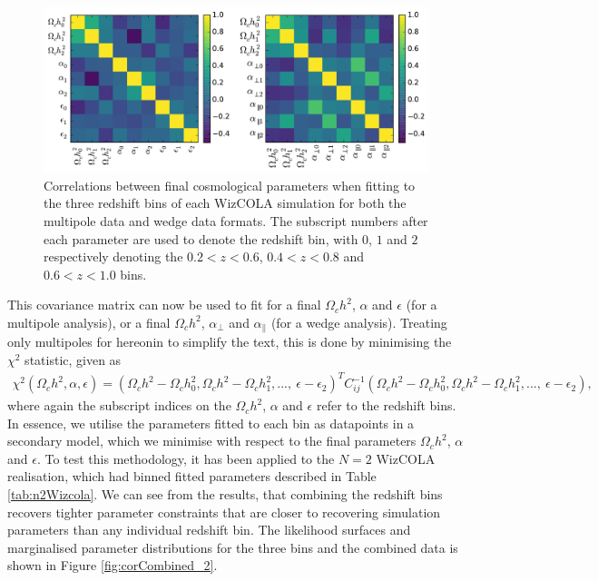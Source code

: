 \documentclass[titlesmallcaps, examinerscopy, copyrightpage]{uqthesis}
\begin{document}
\begin{figure}[h!]
  \begin{center}
    \includegraphics[width=\textwidth]{images/correlations.pdf}
  \end{center}
  \caption{Correlations between final cosmological parameters when fitting to the three redshift bins of each WizCOLA simulation for both the multipole data and wedge data formats. The subscript numbers after each parameter are used to denote the redshift bin, with $0$, $1$ and $2$ respectively denoting the $0.2 < z < 0.6$, $0.4 < z < 0.8$ and $0.6 < z < 1.0$ bins. }
  \label{fig:correlations}
\end{figure}

This covariance matrix can now be used to fit for a final $\Omega_c h^2$, $\alpha$ and $\epsilon$ (for a multipole analysis), or a final $\Omega_c h^2$, $\alpha_\perp$ and $\alpha_\parallel$ (for a wedge analysis). Treating only multipoles for hereonin to simplify the text, this is done by  minimising the $\chi^2$ statistic, given as
\begin{align} \label{eq:covchi}
\chi^2(\Omega_c h^2, \alpha, \epsilon) = (\Omega_c h^2 - \Omega_c h^2_0, \Omega_c h^2 - \Omega_c h^2_1, ...,\  \epsilon - \epsilon_2)^T C_{ij}^{-1}(\Omega_c h^2 - \Omega_c h^2_0, \Omega_c h^2 - \Omega_c h^2_1, ...,\  \epsilon - \epsilon_2),
\end{align}
where again the subscript indices on the $\Omega_c h^2$, $\alpha$ and $\epsilon$ refer to the redshift bins. In essence, we utilise the parameters fitted to each bin as datapoints in a secondary model, which we minimise with respect to the final parameters $\Omega_c h^2$, $\alpha$ and $\epsilon$. To test this methodology, it has been applied to the $N=2$ WizCOLA realisation, which had binned fitted parameters described in Table \ref{tab:n2Wizcola}. We can see from the results, that combining the redshift bins recovers tighter parameter constraints that are closer to recovering simulation parameters than any individual redshift bin. The likelihood surfaces and marginalised parameter distributions for the three bins and the combined data is shown in Figure \ref{fig:corCombined_2}. 
\end{document}
